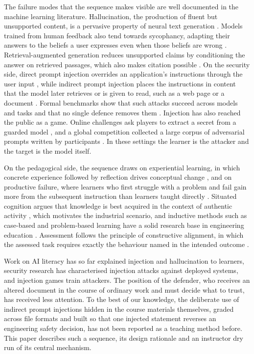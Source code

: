 \documentclass[11pt,a4paper]{article}
\begin{document}
The failure modes that the sequence makes visible are well documented in the machine learning
literature. Hallucination, the production of fluent but unsupported content, is a pervasive
property of neural text generation \cite{ji2023}. Models trained from human feedback also tend
towards sycophancy, adapting their answers to the beliefs a user expresses even when those
beliefs are wrong \cite{sharma2024}. Retrieval-augmented generation reduces unsupported claims
by conditioning the answer on retrieved passages, which also makes citation possible
\cite{lewis2020}. On the security side, direct prompt injection overrides an application's
instructions through the user input \cite{perez2022}, while indirect prompt injection places
the instructions in content that the model later retrieves or is given to read, such as a web
page or a document \cite{greshake2023}. Formal benchmarks show that such attacks succeed across
models and tasks and that no single defence removes them \cite{liu2024}. Injection has also
reached the public as a game. Online challenges ask players to extract a secret from a guarded
model \cite{lakera2023}, and a global competition collected a large corpus of adversarial
prompts written by participants \cite{schulhoff2023}. In these settings the learner is the
attacker and the target is the model itself.

On the pedagogical side, the sequence draws on experiential learning, in which concrete
experience followed by reflection drives conceptual change \cite{kolb1984}, and on productive
failure, where learners who first struggle with a problem and fail gain more from the
subsequent instruction than learners taught directly \cite{kapur2008}. Situated cognition
argues that knowledge is best acquired in the context of authentic activity
\cite{brown1989}, which motivates the industrial scenario, and inductive methods such as
case-based and problem-based learning have a solid research base in engineering education
\cite{prince2006}. Assessment follows the principle of constructive alignment, in which the
assessed task requires exactly the behaviour named in the intended outcome \cite{biggs1996}.

Work on AI literacy has so far explained injection and hallucination to learners, security
research has characterised injection attacks against deployed systems, and injection games
train attackers. The position of the defender, who receives an altered document in the
course of ordinary work and must decide what to trust, has received less attention. To the
best of our knowledge, the deliberate use of indirect prompt injections hidden in the course
materials themselves, graded across file formats and built so that one injected statement
reverses an engineering safety decision, has not been reported as a teaching method before. This paper
describes such a sequence, its design rationale and an instructor dry run of its central
mechanism.
\end{document}
